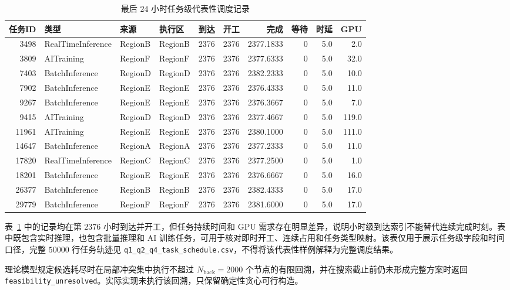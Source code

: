 \begin{table}[htbp]
\centering
\caption{最后 $24$ 小时任务级代表性调度记录}
\label{tab:q1_schedule_examples}
\begin{tabular}{rllllrrrrr}
\toprule
任务ID & 类型 & 来源 & 执行区 & 到达 & 开工 & 完成 & 等待 & 时延 & GPU\\
\midrule
3498 & RealTimeInference & RegionB & RegionB & 2376 & 2376 & 2377.1833 & 0 & 5.0 & 2.0\\
3809 & AITraining & RegionF & RegionF & 2376 & 2376 & 2377.6333 & 0 & 5.0 & 32.0\\
7403 & BatchInference & RegionD & RegionD & 2376 & 2376 & 2382.2333 & 0 & 5.0 & 10.0\\
7902 & BatchInference & RegionE & RegionE & 2376 & 2376 & 2376.4333 & 0 & 5.0 & 11.0\\
9267 & BatchInference & RegionE & RegionE & 2376 & 2376 & 2376.3667 & 0 & 5.0 & 7.0\\
9415 & AITraining & RegionD & RegionD & 2376 & 2376 & 2377.4667 & 0 & 5.0 & 119.0\\
11961 & AITraining & RegionE & RegionE & 2376 & 2376 & 2380.1000 & 0 & 5.0 & 111.0\\
14647 & BatchInference & RegionA & RegionA & 2376 & 2376 & 2377.2333 & 0 & 5.0 & 11.0\\
17820 & RealTimeInference & RegionC & RegionC & 2376 & 2376 & 2377.2500 & 0 & 5.0 & 1.0\\
18201 & BatchInference & RegionE & RegionE & 2376 & 2376 & 2376.6667 & 0 & 5.0 & 16.0\\
26377 & BatchInference & RegionB & RegionB & 2376 & 2376 & 2382.4333 & 0 & 5.0 & 17.0\\
29779 & BatchInference & RegionF & RegionF & 2376 & 2376 & 2381.6000 & 0 & 5.0 & 17.0\\
\bottomrule
\end{tabular}
\end{table}

表~\ref{tab:q1_schedule_examples} 中的记录均在第 $2376$ 小时到达并开工，但任务持续时间和 GPU 需求存在明显差异，说明小时级到达索引不能替代连续完成时刻。表中既包含实时推理，也包含批量推理和 AI 训练任务，可用于核对即时开工、连续占用和任务类型映射。该表仅用于展示任务级字段和时间口径，完整 $50000$ 行任务轨迹见 \texttt{q1\_q2\_q4\_task\_schedule.csv}，不得将该代表性样例解释为完整调度结果。

理论模型规定候选耗尽时在局部冲突集中执行不超过 $N_{\mathrm{back}}=2000$ 个节点的有限回溯，并在搜索截止前仍未形成完整方案时返回 \texttt{feasibility\_unresolved}。实际实现未执行该回溯，只保留确定性贪心可行构造。

